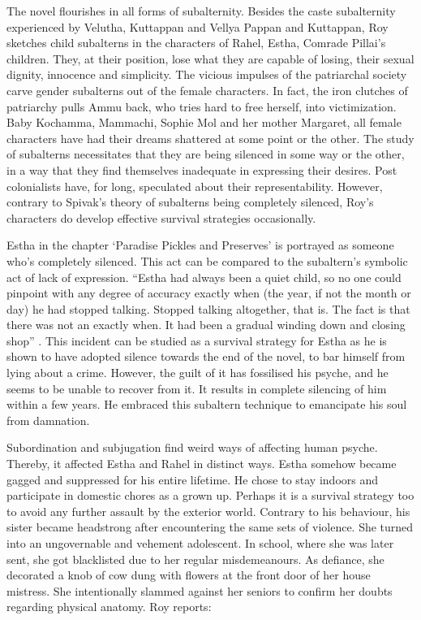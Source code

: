 The novel flourishes in all forms of subalternity. Besides the caste subalternity experienced by Velutha, Kuttappan and Vellya Pappan and Kuttappan, Roy sketches child subalterns in the characters of Rahel, Estha, Comrade Pillai's children. They, at their position, lose what they are capable of losing, their sexual dignity, innocence and simplicity. The vicious impulses of the patriarchal society carve gender subalterns out of the female characters. In fact, the iron clutches of patriarchy pulls Ammu back, who tries hard to free herself, into victimization. Baby Kochamma, Mammachi, Sophie Mol and her mother Margaret, all female characters have had their dreams shattered at some point or the other. The study of subalterns necessitates that they are being silenced in some way or the other, in a way that they find themselves inadequate in expressing their desires. Post colonialists have, for long, speculated about their representability. However, contrary to Spivak's theory of subalterns being completely silenced, Roy's characters do develop effective survival strategies occasionally. 

Estha in the chapter `Paradise Pickles and Preserves' is portrayed as someone who's completely silenced. This act can be compared to the subaltern's symbolic act of lack of expression. ``Estha had always been a quiet child, so no one could pinpoint with any degree of accuracy exactly when (the year, if not the month or day) he had stopped talking. Stopped talking altogether, that is. The fact is that there was not an exactly when. It had been a gradual winding down and closing shop'' \parencite[10]{Roy1997}. This incident can be studied as a survival strategy for Estha as he is shown to have adopted silence towards the end of the novel, to bar himself from lying about a crime. However, the guilt of it has fossilised his psyche, and he seems to be unable to recover from it. It results in complete silencing of him within a few years. He embraced this subaltern technique to emancipate his soul from damnation.  

Subordination and subjugation find weird ways of affecting human psyche. Thereby, it affected Estha and Rahel in distinct ways. Estha somehow became gagged and suppressed for his entire lifetime. He chose to stay indoors and participate in domestic chores as a grown up. Perhaps it is a survival strategy too to avoid any further assault by the exterior world. Contrary to his behaviour, his sister became headstrong after encountering the same sets of violence. She turned into an ungovernable and vehement adolescent. In school, where she was later sent, she got blacklisted due to her regular misdemeanours. As defiance, she decorated a knob of cow dung with flowers at the front door of her house mistress. She intentionally slammed against her seniors to confirm her doubts regarding physical anatomy. Roy reports: 

